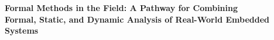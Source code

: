 \documentclass[11pt]{article}
\begin{document}
\begin{center}
  \Large\bf Formal Methods in the Field: A Pathway for Combining\\Formal, Static, and
  Dynamic Analysis of Real-World Embedded Systems
\end{center}













\newpage
\setcounter{page}{1}



\end{document}
